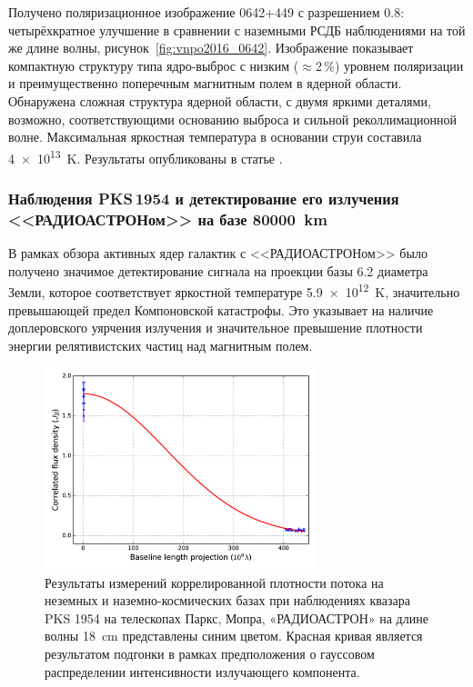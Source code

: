 Получено поляризационное изображение 0642+449 с разрешением \SI{0.8}{\mas}: четырёхкратное улучшение
в сравнении с наземными РСДБ наблюдениями на той же длине волны, рисунок~\ref{fig:vnpo2016_0642}.
Изображение показывает компактную структуру типа ядро-выброс с низким ($\approx$2\,\%) уровнем
поляризации и преимущественно поперечным магнитным полем в ядерной области. Обнаружена сложная
структура ядерной области, с двумя яркими деталями, возможно, соответствующими основанию выброса и
сильной реколлимационной волне. Максимальная яркостная температура в основании струи составила
\SI{4e13}{\kelvin}. Результаты опубликованы в статье \cite{Lobanov_2015}.

\subsubsection{Наблюдения PKS\,1954 и детектирование его излучения <<РАДИОАСТРОНом>>
на базе \SI{80000}{\km}}

В рамках обзора активных ядер галактик с <<РАДИОАСТРОНом>> было получено значимое детектирование
сигнала на проекции базы 6.2 диаметра Земли, которое соответствует яркостной температуре
\SI{5.9e12}{\kelvin}, значительно превышающей предел Компоновской катастрофы. Это указывает на
наличие доплеровского уярчения излучения и значительное превышение плотности энергии релятивистских
частиц над магнитным полем.

\begin{figure}[tbh]
\centering
\includegraphics[width=0.7\textwidth]{vNPO2016_1954.jpg}

\caption{Результаты измерений коррелированной плотности потока на неземных и наземно-космических
базах при наблюдениях квазара PKS 1954 на телескопах Паркс, Мопра, «РАДИОАСТРОН» на
длине волны \SI{18}{\cm} представлены синим цветом. Красная кривая является результатом подгонки в
рамках предположения о гауссовом распределении интенсивности излучающего компонента.}
\label{fig:vnpo2016_1954}
\end{figure}

